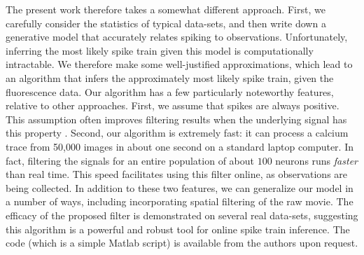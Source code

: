 
The present work therefore takes a somewhat different approach.  First, we carefully consider the statistics of typical data-sets, and then write down a generative model that accurately relates spiking to observations. Unfortunately, inferring the most likely spike train given this model is computationally intractable.  We therefore make some well-justified approximations, which lead to an algorithm that infers the approximately most likely spike train, given the fluorescence data.  Our algorithm has a few particularly noteworthy features, relative to other approaches.  First, we assume that spikes are always positive.  This assumption often improves filtering results when the underlying signal has this property \cite{LeeSeung99, LeeSeung01, HuysPaninski06}.  Second, our algorithm is extremely fast: it can process a calcium trace from 50,000 images in about one second on a standard laptop computer. In fact, filtering the signals for an entire population of about $100$ neurons runs \emph{faster} than real time. This speed facilitates using this filter online, as observations are being collected. In addition to these two features, we can generalize our model in a number of ways, including incorporating spatial filtering of the raw movie. The efficacy of the proposed filter is demonstrated on several real data-sets, suggesting this algorithm is a powerful and robust tool for online spike train inference.  The code (which is a simple Matlab script) is available from the authors upon request. 